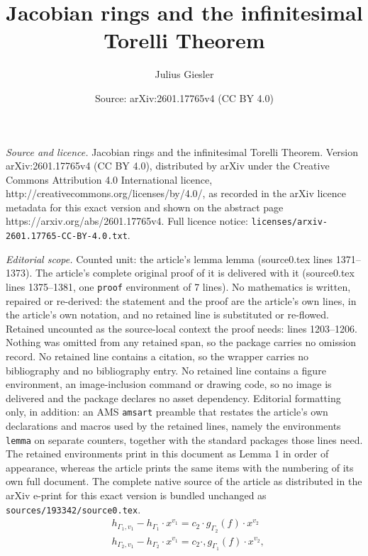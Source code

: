 \documentclass[10pt,a4paper]{amsart}
\title{Jacobian rings and the infinitesimal Torelli Theorem}
\author{Julius Giesler}
\date{Source: arXiv:2601.17765v4 (CC BY 4.0)}
\begin{document}
\maketitle

\noindent\emph{Source and licence.} Jacobian rings and the infinitesimal Torelli Theorem. Version arXiv:2601.17765v4 (CC BY 4.0), distributed by arXiv under the Creative Commons Attribution 4.0 International licence, http://creativecommons.org/licenses/by/4.0/, as recorded in the arXiv licence metadata for this exact version and shown on the abstract page https://arxiv.org/abs/2601.17765v4. Full licence notice: \texttt{licenses/arxiv-2601.17765-CC-BY-4.0.txt}.\par\smallskip

\noindent\textit{Editorial scope.} Counted unit: the article's lemma lemma (source0.tex lines 1371--1373). The article's complete original proof of it is delivered with it (source0.tex lines 1375--1381, one \texttt{proof} environment of 7 lines). No mathematics is written, repaired or re-derived: the statement and the proof are the article's own lines, in the article's own notation, and no retained line is substituted or re-flowed.  Retained uncounted as the source-local context the proof needs: lines 1203--1206.  Nothing was omitted from any retained span, so the package carries no omission record.  No retained line contains a citation, so the wrapper carries no bibliography and no bibliography entry.  No retained line contains a figure environment, an image-inclusion command or drawing code, so no image is delivered and the package declares no asset dependency.  Editorial formatting only, in addition: an AMS \texttt{amsart} preamble that restates the article's own declarations and macros used by the retained lines, namely the environments \texttt{lemma} on separate counters, together with the standard packages those lines need.  The retained environments print in this document as Lemma 1 in order of appearance, whereas the article prints the same items with the numbering of its own full document.  The complete native source of the article as distributed in the arXiv e-print for this exact version is bundled unchanged as \texttt{sources/193342/source0.tex}.
\begin{align}
	& h_{\Gamma_1,v_1} - h_{\Gamma_1} \cdot x^{v_1} = c_2 \cdot g_{\Gamma_2}(f) \cdot x^{v_2} \label{equation_relation_in_D_f_k_first} \\
	& h_{\Gamma_2,v_1} - h_{\Gamma_2} \cdot x^{v_1} = c_2 \cdot, g_{\Gamma_1}(f) \cdot x^{v_2}, \label{equation_relation_in_D_f_k_second}
\end{align}
\end{document}
